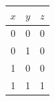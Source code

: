 \begin{tabular}{ccc}\toprule
\(x\)&\(y\)&\(z\)\\\midrule
0&0&0\\
0&1&0\\
1&0&0\\
1&1&1\\
\bottomrule\end{tabular}
